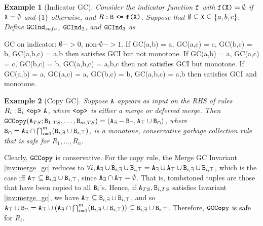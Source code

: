 \documentclass{article}
\numberwithin{equation}{section}
\newtheorem{example}{Example}[section]
\renewcommand{\tt}[1]{\ifmmode\text{\texttt{#1}}\else\texttt{#1}\fi}
\begin{document}
\begin{example}[Indicator GC]
Consider the indicator function $\tt{f}$ with $\tt{f}\tt{(}\tt{X}\tt{)} = \emptyset$ if $\tt{X} = \emptyset$ and $\{1\}$ otherwise, and $R: \tt{B} ~\tt{<=}~ \tt{f}\tt{(}\tt{X}\tt{)}$.
Suppose that $\emptyset \subseteq \tt{X} \subseteq \{a,b,c\}$.
Define $\tt{GCInd}_{safe}$, $\tt{GCInd}_2$, and $\tt{GCInd}_3$ as
\end{example}

GC on indicator: $\emptyset -> 0$, non-$\emptyset -> 1$.
If GC(a,b) = a, GC(a,c) = c, GC(b,c) = b, GC(a,b,c) = a,b then satisfies GCI but not monotone.
If GC(a,b) = a, GC(a,c) = c, GC(b,c) = b, GC(a,b,c) = a,b,c then not satisfies GCI but monotone.
If GC(a,b) = a, GC(a,c) = a, GC(b,c) = b, GC(a,b,c) = a,b then satisfies GCI and monotone.

\begin{example}[Copy GC]
Suppose $\tt{A}$ appears as input on the RHS of rules $R_i: \tt{B}_i ~\tt{<op>}~ \tt{A}$, where $\tt{<op>}$ is either a merge or deferred merge.
Then $\tt{GCCopy}(\tt{A}_{TS}; \tt{B}_{1,TS}, \dots, \tt{B}_{m,TS}) = \left(\tt{A}_\exists - \tt{B}_\cap, \tt{A}_\top \cup \tt{B}_\cap\right)$,
where $\tt{B}_\cap = \tt{A}_\exists \cap \bigcap_{i=1}^m (\tt{B}_{i,\exists} \cup \tt{B}_{i,\top})$,
is a monotone, conservative garbage collection rule that is safe for $R_1, \dots, R_n$.
\end{example}
Clearly, $\tt{GCCopy}$ is conservative.
For the copy rule, the Merge GC Invariant \ref{inv:merge_gc} reduces to $\forall i, \tt{A}_\exists \cup \tt{B}_{i,\exists} \cup \tt{B}_{i,\top} = \tt{A}_\exists \cup \tt{A}_\top \cup \tt{B}_{i,\exists} \cup \tt{B}_{i,\top}$, which is the case iff $\tt{A}_\top \subseteq \tt{B}_{i,\exists} \cup \tt{B}_{i,\top}$, since $\tt{A}_\exists \cap \tt{A}_\top = \emptyset$.
That is, tombstoned tuples are those that have been copied to all $\tt{B}_i$'s.
Hence, if $\tt{A}_{TS}, \tt{B}_{i,TS}$ satisfies Invariant \ref{inv:merge_gc}, we have $\tt{A}_\top \subseteq \tt{B}_{i,\exists} \cup \tt{B}_{i,\top}$, and so $\tt{A}_\top \cup \tt{B}_\cap = \tt{A}_\top \cup \left(\tt{A}_\exists \cap \bigcap_{i=1}^m (\tt{B}_{i,\exists} \cup \tt{B}_{i,\top})\right) \subseteq \tt{B}_{i,\exists} \cup \tt{B}_{i,\top}$.
Therefore, $\tt{GCCopy}$ is safe for $R_i$.
\end{document}
